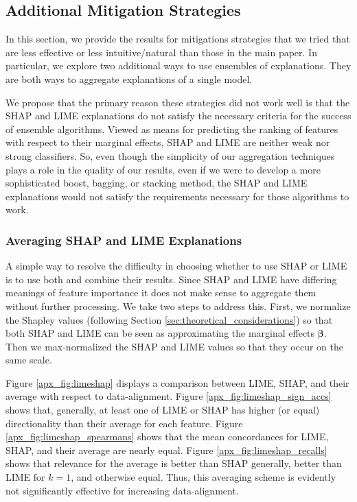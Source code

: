 \documentclass[12pt]{article}  %
\begin{document}
    
    
    
  
    \subsection{Additional Mitigation Strategies}
        \label{apx_sec:additional_mitigations}
        In this section, we provide the results for mitigations strategies that we tried that are less effective or less intuitive/natural than those in the main paper. In particular, we explore two additional ways to use ensembles of explanations. They are both ways to aggregate explanations of a single model. 
        
        We propose that the primary reason these strategies did not work well is that the SHAP and LIME explanations do not satisfy the necessary criteria for the success of ensemble algorithms. Viewed as means for predicting the ranking of features with respect to their marginal effects, SHAP and LIME are neither weak nor strong classifiers. So, even though the simplicity of our aggregation techniques plays a role in the quality of our results, even if we were to develop a more sophisticated boost, bagging, or stacking method, the SHAP and LIME explanations would not satisfy the requirements necessary for those algorithms to work. %

            \subsubsection{Averaging SHAP and LIME Explanations}
            A simple way to resolve the difficulty in choosing whether to use SHAP or LIME is to use both and combine their results. Since SHAP and LIME have differing meanings of feature importance it does not make sense to aggregate them without further processing. We take two steps to address this. First, we normalize the Shapley values (following Section \ref{sec:theoretical_considerations}) so that both SHAP and LIME can be seen as approximating the marginal effects $\boldsymbol{\beta}$. Then we max-normalized the SHAP and LIME values so that they occur on the same scale. 

            Figure \ref{apx_fig:limeshap} displays a comparison between LIME, SHAP, and their average with respect to data-alignment. Figure \ref{apx_fig:limeshap_sign_accs} shows that, generally, at least one of LIME or SHAP has higher (or equal) directionality than their average for each feature. Figure \ref{apx_fig:limeshap_spearmans} shows that the mean concordances for LIME, SHAP, and their average are nearly equal. Figure \ref{apx_fig:limeshap_recalls} shows that relevance for the average is better than SHAP generally, better than LIME for $k=1$, and otherwise equal. Thus, this averaging scheme is evidently not significantly effective for increasing data-alignment. 
\end{document}
